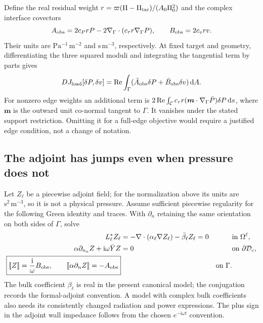 Define the real residual weight $r=\varpi(\Pi-\Pi_{\rm tar})/(A_0\Pi_0^2)$
and the complex interface covectors
\begin{equation}
 A_{\rm obs}=2c_PrP-2\nabla_\Gamma\cdot(c_\tau r\nabla_\Gamma P),
 \qquad B_{\rm obs}=2c_vrv.
 \label{eq:interface-covectors}
\end{equation}
Their units are $\mathrm{Pa^{-1}\,m^{-2}}$ and $\mathrm{s\,m^{-3}}$,
respectively. At fixed target and geometry, differentiating the three squared
moduli and integrating the tangential term by parts gives
\begin{equation}
 DJ_{\rm load}[\delta P,\delta v]
       =\operatorname{Re}\int_\Gamma
          (\bar A_{\rm obs}\delta P+\bar B_{\rm obs}\delta v)\,\mathrm d A.
 \label{eq:load-state-variation}
\end{equation}
For nonzero edge weights an additional term is
$2\operatorname{Re}\int_{\mathcal C}c_\tau r(\bm m\cdot\nabla_\Gamma\bar P)\delta P\,\mathrm d s$,
where $\bm m$ is the outward unit co-normal tangent to $\Gamma$. It vanishes
under the stated support restriction. Omitting it for a full-edge objective
would require a justified edge condition, not a change of notation.

\subsection{The adjoint has jumps even when pressure does not}
Let $Z_\ell$ be a piecewise adjoint field; for the normalization above its units
are $\mathrm{s^2\,m^{-3}}$, so it is not a physical pressure. Assume sufficient
piecewise regularity for the following Green identity and traces. With
$\partial_n$ retaining the same orientation on both sides of $\Gamma$, solve
\begin{align}
 L_\ell^*Z_\ell&=-\nabla\cdot(\alpha_\ell\nabla Z_\ell)
                           -\bar\beta_\ell Z_\ell=0
                  &&\text{in }\Omega^\ell,\label{eq:source-adjoint-bulk}\\
 \alpha\partial_{n_a}Z+\mathrm i\omega\bar Y Z&=0
                  &&\text{on }\partial\mathcal D_c,\label{eq:source-adjoint-wall}\\
 \boxed{\left[\!\left[Z\right]\!\right]=\frac{\mathrm i}{\omega}B_{\rm obs},\qquad
 \left[\!\left[\alpha\partial_nZ\right]\!\right]=-A_{\rm obs}}
                  &&\text{on }\Gamma.\label{eq:source-adjoint-jumps}
\end{align}
The bulk coefficient $\beta_\ell$ is real in the present canonical model;
the conjugation records the formal-adjoint convention. A model with complex
bulk coefficients also needs its consistently changed radiation and power
expressions. The plus sign in the adjoint wall impedance follows from the
chosen $e^{-\mathrm i\omega t}$ convention.

